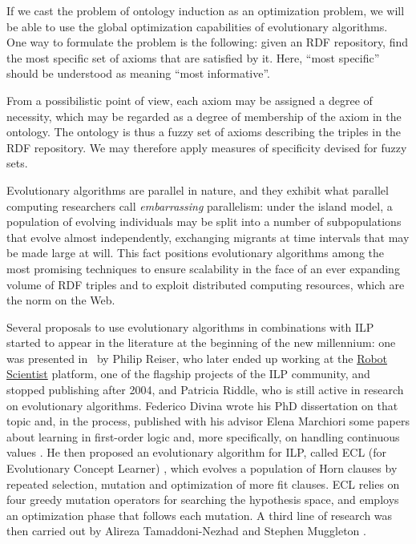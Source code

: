 \documentclass[a4paper]{article}
\newcounter{ex}
\begin{document}
If we cast the problem of ontology induction as an optimization problem,
we will be able to use the global optimization capabilities of evolutionary algorithms.
One way to formulate the problem is the following: given an RDF repository,
find the most specific set of axioms that are satisfied by it.
Here, ``most specific'' should be understood as meaning ``most informative''.

From a possibilistic point of view, each axiom may be assigned a degree of necessity,
which may be regarded as a degree of membership of the axiom in the ontology.
The ontology is thus a fuzzy set of axioms describing the triples in the RDF repository.
We may therefore apply measures of specificity devised for fuzzy sets.

Evolutionary algorithms are parallel in nature, and they exhibit what parallel
computing researchers call \emph{embarrassing} parallelism: under the island model,
a population of evolving individuals may be split into a number of subpopulations
that evolve almost independently, exchanging migrants at time intervals that may be
made large at will. This fact positions evolutionary algorithms among the most
promising techniques to ensure scalability in the face of an ever expanding volume
of RDF triples and to exploit distributed computing resources, which are the norm
on the Web.

Several proposals to use evolutionary algorithms in combinations with ILP started
to appear in the literature at the beginning of the new millennium:
one was presented in~\cite{ReiserRiddle2001} by Philip Reiser, who later ended up working at the
\href{http://en.wikipedia.org/wiki/Robot_Scientist}{Robot Scientist}
platform, one of the flagship projects of the ILP community, and stopped publishing after 2004,
and Patricia Riddle, who is still active in research on evolutionary algorithms.
Federico Divina wrote his PhD dissertation \cite{Divina2004th} on that topic and,
in the process, published with his advisor Elena Marchiori some papers about
learning in first-order logic \cite{DivinaMarchiori2001,DivinaMarchiori2002}
and, more specifically, on handling continuous values \cite{DivinaMarchiori2005}.
He then proposed an evolutionary algorithm for ILP, called ECL
(for Evolutionary Concept Learner) \cite{Divina2010}, which evolves a population of
Horn clauses by repeated selection, mutation and optimization of more fit clauses.
ECL relies on four greedy mutation operators for searching the hypothesis space,
and employs an optimization phase that follows each mutation.
A third line of research was then carried out by Alireza Tamaddoni-Nezhad and
Stephen Muggleton
\cite{TamaddoniNezhadMuggleton2000,TamaddoniNezhadMuggleton2002,TamaddoniNezhadMuggleton2008}.
\end{document}
